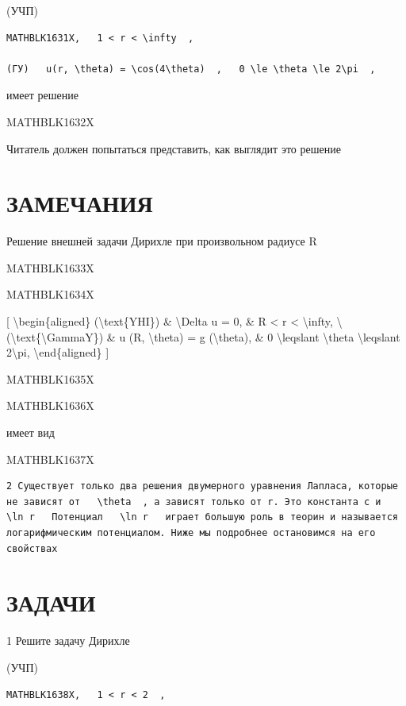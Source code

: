 \documentclass[
]{article}
\begin{document}
{{{(УЧП)

\begin{verbatim}
MATHBLK1631X,   1 < r < \infty  ,

(ГУ)   u(r, \theta) = \cos(4\theta)  ,   0 \le \theta \le 2\pi  ,
\end{verbatim}

имеет решение

MATHBLK1632X

Читатель должен попытаться представить, как выглядит это решение

\section{ЗАМЕЧАНИЯ}\label{ux437ux430ux43cux435ux447ux430ux43dux438ux44f-13}

Решение внешней задачи Дирихле при произвольном радиусе R

MATHBLK1633X

MATHBLK1634X

{[} \textbackslash begin\{aligned\} (\textbackslash text\{YHI\}) \&
\textbackslash Delta u = 0, \& R \textless{} r \textless{}
\textbackslash infty, \textbackslash{}
(\textbackslash text\{\textbackslash GammaY\}) \& u (R,
\textbackslash theta) = g (\textbackslash theta), \& 0
\textbackslash leqslant \textbackslash theta \textbackslash leqslant
2\textbackslash pi, \textbackslash end\{aligned\} {]}

MATHBLK1635X

MATHBLK1636X

имеет вид

MATHBLK1637X

\begin{verbatim}
2 Существует только два решения двумерного уравнения Лапласа, которые не зависят от   \theta  , а зависят только от r. Это константа c и   \ln r   Потенциал   \ln r   играет большую роль в теорин и называется логарифмическим потенциалом. Ниже мы подробнее остановимся на его свойствах
\end{verbatim}

\section{ЗАДАЧИ}\label{ux437ux430ux434ux430ux447ux438-13}

1 Решите задачу Дирихле

(УЧП)

\begin{verbatim}
MATHBLK1638X,   1 < r < 2  ,
\end{verbatim}

}}}
\end{document}
